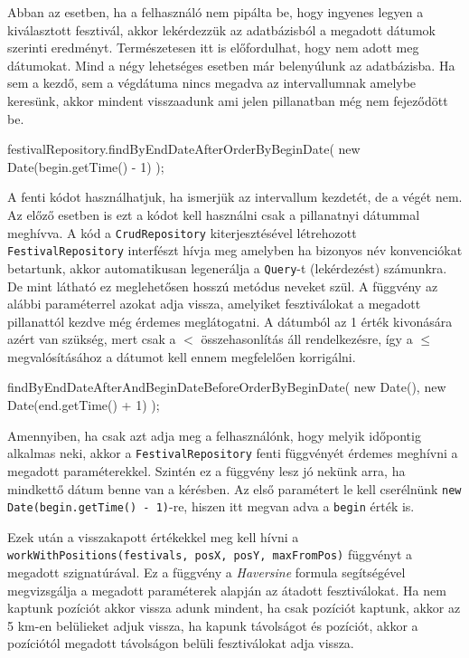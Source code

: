 Abban az esetben, ha a felhasználó nem pipálta be, hogy ingyenes legyen a kiválasztott fesztivál, akkor lekérdezzük az adatbázisból a megadott dátumok szerinti eredményt.
Természetesen itt is előfordulhat, hogy nem adott meg dátumokat. Mind a négy lehetséges esetben már belenyúlunk az adatbázisba. Ha sem a kezdő, sem a végdátuma nincs megadva az intervallumnak amelybe keresünk, akkor mindent visszaadunk ami jelen pillanatban még nem fejeződött be.

\begin{java}
festivalRepository.findByEndDateAfterOrderByBeginDate(
    new Date(begin.getTime() - 1)
);
\end{java}

A fenti kódot használhatjuk, ha ismerjük az intervallum kezdetét, de a végét nem. Az előző esetben is ezt a kódot kell használni csak a pillanatnyi dátummal meghívva.
A kód a \texttt{CrudRepository} kiterjesztésével létrehozott \texttt{FestivalRepository} interfészt hívja meg amelyben ha bizonyos név konvenciókat betartunk, akkor automatikusan legenerálja a \texttt{Query}-t (lekérdezést) számunkra. De mint látható ez meglehetősen hosszú metódus neveket szül. A függvény az alábbi paraméterrel azokat adja vissza, amelyiket fesztiválokat a megadott pillanattól kezdve még érdemes meglátogatni. A dátumból az 1 érték kivonására azért van szükség, mert csak a $<$ összehasonlítás áll rendelkezésre, így a $\le$ megvalósításához a dátumot kell ennem megfelelően korrigálni.

\begin{java}
findByEndDateAfterAndBeginDateBeforeOrderByBeginDate(
    new Date(), new Date(end.getTime() + 1)
);
\end{java}

Amennyiben, ha csak azt adja meg a felhasználónk, hogy melyik időpontig alkalmas neki, akkor a \texttt{FestivalRepository} fenti függvényét érdemes meghívni a megadott paraméterekkel.
Szintén ez a függvény lesz jó nekünk arra, ha mindkettő dátum benne van a kérésben. Az első paramétert le kell cserélnünk \texttt{new Date(begin.getTime() - 1)}-re, hiszen itt megvan adva a \texttt{begin} érték is.

Ezek után a visszakapott értékekkel meg kell hívni a \texttt{workWithPositions(festivals, posX, posY, maxFromPos)} függvényt a megadott szignatúrával. Ez a függvény a \textit{Haversine} formula segítségével megvizsgálja a megadott paraméterek alapján az átadott fesztiválokat. Ha nem kaptunk pozíciót akkor vissza adunk mindent, ha csak pozíciót kaptunk, akkor az 5 km-en belülieket adjuk vissza, ha kapunk távolságot és pozíciót, akkor a pozíciótól megadott távolságon belüli fesztiválokat adja vissza.

